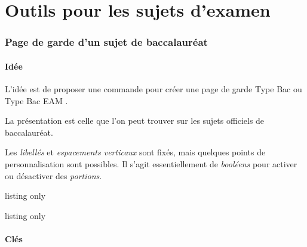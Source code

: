 \part{Outils pour les sujets d'examen}

\section{Page de garde d'un sujet de baccalauréat}\label{pagegardebac}

\subsection{Idée}

\begin{tipblock}
 L'idée est de proposer une commande pour créer une page de garde \og Type Bac \fg{} ou \og Type Bac EAM \fg.

La présentation est celle que l'on peut trouver sur les sujets officiels de baccalauréat.

\smallskip

Les \textit{libellés} et \textit{espacements verticaux} sont fixés, mais quelques points de personnalisation sont possibles. Il s'agit essentiellement de \textit{booléens} pour activer ou désactiver des \textit{portions}.
\end{tipblock}

\begin{PresCodeTexPL}{listing only}
\PageGardeSujetBac[clés]
\end{PresCodeTexPL}

\begin{PresCodeTexPL}{listing only}
\PageGardeSujetBacEAM[clés]
\end{PresCodeTexPL}

\subsection{Clés}

